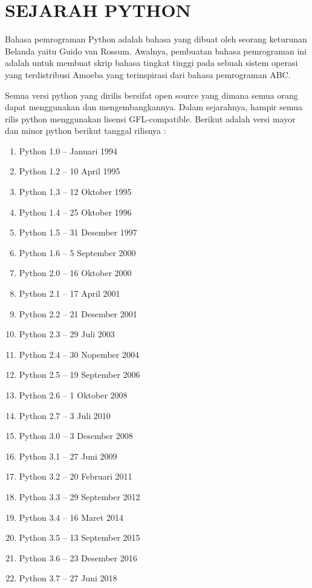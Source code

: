 \chapter*{SEJARAH PYTHON}

\par
Bahasa pemrograman Python adalah bahasa yang dibuat oleh seorang keturunan Belanda yaitu Guido van Rossum. Awalnya, pembuatan bahasa pemrograman ini adalah untuk membuat skrip bahasa tingkat tinggi pada sebuah sistem operasi yang terdistribusi Amoeba yang terinspirasi dari bahasa pemrograman ABC.
\par
Semua versi python yang dirilis bersifat open source yang dimana semua orang dapat menggunakan dan mengembangkannya. Dalam sejarahnya, hampir semua rilis python menggunakan lisensi GFL-compatible. Berikut adalah versi mayor dan minor python berikut tanggal rilisnya :
		
\begin{enumerate}
\item Python 1.0 – Januari 1994
\item Python 1.2 – 10 April 1995
\item Python 1.3 – 12 Oktober 1995
\item Python 1.4 – 25 Oktober 1996
\item Python 1.5 – 31 Desember 1997
\item Python 1.6 – 5 September 2000
\item Python 2.0 – 16 Oktober 2000
\item Python 2.1 – 17 April 2001
\item Python 2.2 – 21 Desember 2001
\item Python 2.3 – 29 Juli 2003
\item Python 2.4 – 30 Nopember 2004
\item Python 2.5 – 19 September 2006
\item Python 2.6 – 1 Oktober 2008
\item Python 2.7 – 3 Juli 2010
\item Python 3.0 – 3 Desember 2008
\item Python 3.1 – 27 Juni 2009
\item Python 3.2 – 20 Februari 2011
\item Python 3.3 – 29 September 2012
\item Python 3.4 – 16 Maret 2014
\item Python 3.5 – 13 September 2015
\item Python 3.6 – 23 Desember 2016
\item Python 3.7 – 27 Juni 2018
\end{enumerate}

